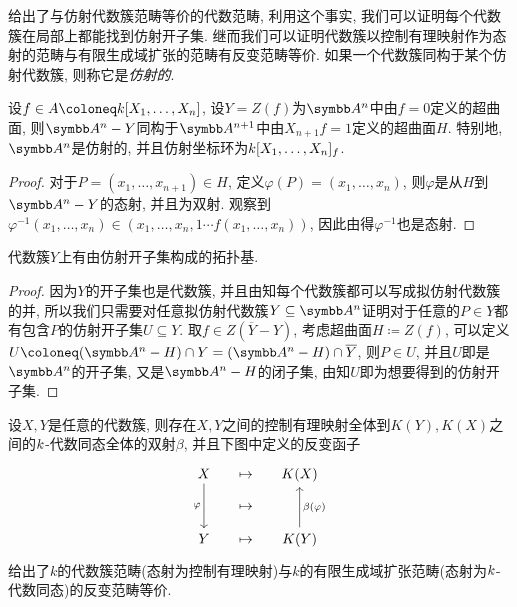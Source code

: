 给出了与仿射代数簇范畴等价的代数范畴, 利用这个事实, 我们可以证明每个代数簇在局部上都能找到仿射开子集. 继而我们可以证明代数簇以控制有理映射作为态射的范畴与有限生成域扩张的范畴有反变范畴等价. 如果一个代数簇同构于某个仿射代数簇, 则称它是\emph{仿射的}.

\begin{proposition}\label{prop:hypersurfaceaffine}
  设$f\in A\coloneq \kk [X_1, \dotsc, X_n]$, 设$Y=Z(f)$为$\AF^n$中由$f=0$定义的超曲面, 则$\AF^n-Y$同构于$\AF^{n+1}$中由$X_{n+1}f=1$定义的超曲面$H$. 特别地, $\AF^n$是仿射的, 并且仿射坐标环为$k [X_1, \dotsc, X_n]_{f}$.
\end{proposition}

\begin{proof}
  对于$P=(x_1, \dotsc, x_{n+1})\in H$, 定义$\varphi (P)=(x_1, \dotsc, x_n)$, 则$\varphi$是从$H$到$\AF^n - Y$的态射, 并且为双射. 观察到$\varphi^{-1}(x_1, \dotsc, x_n)\in (x_1, \dotsc, x_n, 1{\dotsb} f(x_1, \dotsc, x_n))$, 因此由得$\varphi^{-1}$也是态射.
\end{proof}

\begin{proposition}\label{prop:affinetopologicalbasis}
  代数簇$Y$上有由仿射开子集构成的拓扑基.
\end{proposition}

\begin{proof}
  因为$Y$的开子集也是代数簇, 并且由知每个代数簇都可以写成拟仿射代数簇的并, 所以我们只需要对任意拟仿射代数簇$Y\subseteq \AF^n$证明对于任意的$P\in Y$都有包含$P$的仿射开子集$U\subseteq Y$. 取$f\in Z(\overline{Y}-Y)$, 考虑超曲面$H\coloneq Z(f)$, 可以定义$U\coloneq (\AF^n-H )\cap Y= (\AF^n -H)\cap \overline{Y}$, 则$P\in U$, 并且$U$即是$\AF^n$的开子集, 又是$\AF^n -H$的闭子集, 由知$U$即为想要得到的仿射开子集.
\end{proof}

\begin{theorem}
  设$X, Y$是任意的代数簇, 则存在$X, Y$之间的控制有理映射全体到$K(Y), K(X)$之间的$k$-代数同态全体的双射$\beta$, 并且下图中定义的反变函子
  \begin{equation*}
    \begin{tikzcd}[sep=small]
      X \arrow[dd, "\varphi"'] & \mapsto & K(X)\\
      & \mapsto & \\
      Y & \mapsto & K(Y) \arrow[uu, "\beta (\varphi)"']
    \end{tikzcd}
  \end{equation*}
  给出了$k$的代数簇范畴(态射为控制有理映射)与$k$的有限生成域扩张范畴(态射为$k$-代数同态)的反变范畴等价.
\end{theorem}

